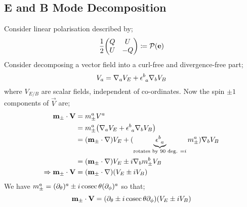 \subsection{E and B Mode Decomposition}
Consider linear polarisation described by;
\begin{equation*}
\frac{1}{2}\twobytwo{Q}{U}{U}{-Q} \coloneqq \mathcal{P}(\vec{e})
\end{equation*}
Consider decomposing a vector field into a curl-free and divergence-free part;
\begin{equation*}
V_a = \nabla_a V_E + \epsilon\indices{^{b}_{a}}\nabla_b V_B
\end{equation*}
where $V_{E/B}$ are scalar fields, independent of co-ordinates. Now the spin $\pm 1$ components of $\vec{V}$ are;
\begin{align*}
\vec{m}_{\pm}\cdot\vec{V} &= m_{\pm}^{a}V^{a} \\
&= m_{\pm}^{a}\left(\nabla_a V_E + \epsilon\indices{^{b}_{a}}\nabla_b V_B\right) \\
&= \left(\vec{m}_{\pm} \cdot \nabla\right)V_E + (\underbrace{\epsilon\indices{^{b}_{a}}}_{\text{rotates by 90 deg. } = i}m_{\pm}^{a})\nabla_b V_B \\
&= \left(\vec{m}_{\pm}\cdot\nabla\right)V_E \pm i\nabla_b m_{\pm}^{b}V_B \\
\Rightarrow \vec{m}_{\pm}\cdot \vec{V} &= \left(\vec{m}_{\pm}\cdot \nabla\right)\left(V_E \pm i V_B\right)
\end{align*}
We have $m_{\pm}^{a} = (\partial_\theta)^{a} \pm i\operatorname{cosec}\theta (\partial_\phi)^{a}$ so that;
\begin{equation*}
\vec{m}_{\pm}\cdot\vec{V} = \left(\del_\theta \pm i \cosec\theta \del_\phi\right)\left(V_E \pm i V_B\right)
\end{equation*}

